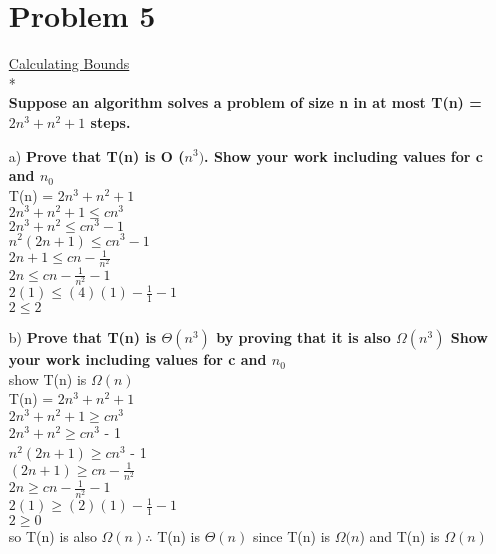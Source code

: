\documentclass[11pt]{article}
\begin{document}
\begin{itemize}
\section*{Problem 5} 
	{\underline{Calculating Bounds}}\\*\\
	{\bf Suppose an algorithm solves a problem of size n in at most T(n) = $2n^3 + n^2 + 1$ steps.}
\item[a)] {\bf Prove that T(n) is O ($n^3)$. Show your work including values for c and $n_{0}$}\\
T(n) = $2n^3 + n^2 + 1$\\
$2n^3 + n^2 + 1 \leq cn^3$\\
$2n^3 + n^2 \leq cn^3 - 1$\\
$n^2(2n + 1) \leq cn^3 - 1$\\
$2n + 1 \leq cn - \frac{1}{n^2}$\\
$2n \leq cn - \frac{1}{n^2} - 1$\thickspace {}\\
$2(1) \leq (4)(1) - \frac{1}{1} -1$\\
$2 \leq 2$
\item[b)] {\bf Prove that T(n) is $\Theta(n^3)$ by proving that it is also $\Omega(n^3)$ Show your work including values for c and $n_{0}$ }\\
show T(n) is $\Omega(n)$\\
T(n) = $2n^3 + n^2 + 1$\\
$2n^3 + n^2 + 1 \geq cn^3$\\
$2n^3 + n^2 \geq cn^3$ - 1\\
$n^2(2n + 1) \geq cn^3$ - 1\\
$(2n + 1) \geq cn - \frac{1}{n^2}$\\
$2n \geq cn - \frac{1}{n^2} - 1$\\
$2(1) \geq (2)(1) - \frac{1}{1} - 1$\\
$2 \geq 0$\\
so T(n) is also $\Omega(n) \therefore$ T(n) is $\Theta(n)$ since T(n) is $\Omega(n$) and T(n) is $\Omega(n)$\\

\end{itemize}
\end{document}
